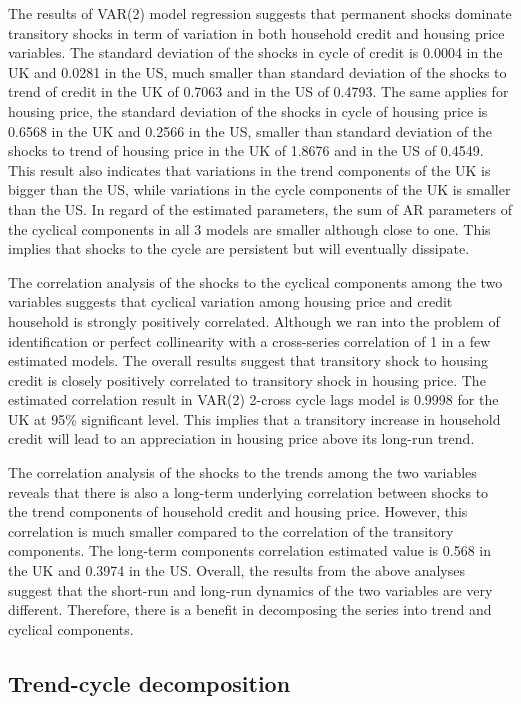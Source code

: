 \documentclass[12pt]{article}
\begin{document}
\begin{outline}[enumerate]
		The results of VAR(2) model regression suggests that permanent shocks dominate transitory shocks in term of variation in both household credit and housing price variables. The standard deviation of the shocks in cycle of credit is 0.0004 in the UK and 0.0281 in the US, much smaller than standard deviation of the shocks to trend of credit in the UK of 0.7063 and in the US of 0.4793. The same applies for housing price, the standard deviation of the shocks in cycle of housing price is 0.6568 in the UK and 0.2566 in the US, smaller than standard deviation of the shocks to trend of housing price in the UK of 1.8676 and in the US of 0.4549. This result also indicates that variations in the trend components of the UK is bigger than the US, while variations in the cycle components of the UK is smaller than the US. In regard of the estimated parameters, the sum of AR parameters of the cyclical components in all 3 models are smaller although close to one. This implies that shocks to the cycle are persistent but will eventually dissipate.
		
		The correlation analysis of the shocks to the cyclical components among the two variables suggests that cyclical variation among housing price and credit household is strongly positively correlated. Although we ran into the problem of identification or perfect collinearity with a cross-series correlation of 1 in a few estimated models. The overall results suggest that transitory shock to housing credit is closely positively correlated to transitory shock in housing price. The estimated correlation result in VAR(2) 2-cross cycle lags model is 0.9998 for the UK at 95\% significant level. This implies that a transitory increase in household credit will lead to an appreciation in housing price above its long-run trend.
		
		The correlation analysis of the shocks to the trends among the two variables reveals that there is also a long-term underlying correlation between shocks to the trend components of household credit and housing price. However, this correlation is much smaller compared to the correlation of the transitory components. The long-term components correlation estimated value is 0.568 in the UK and 0.3974 in the US. Overall, the results from the above analyses suggest that the short-run and long-run dynamics of the two variables are very different. Therefore, there is a benefit in decomposing the series into trend and cyclical components.
		
		
		\subsection{Trend-cycle decomposition}
		

\end{outline}
\end{document}
